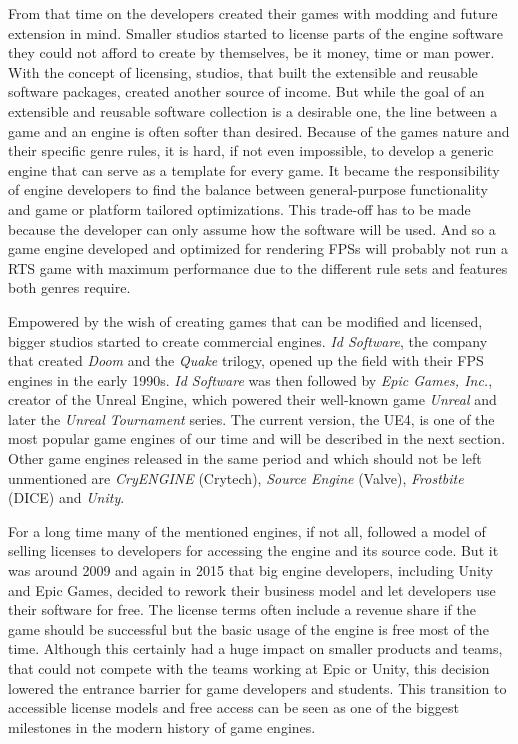 From that time on the developers created their games with modding and future extension in mind. Smaller studios started to license parts of the engine software they could not afford to create by themselves, be it money, time or man power. With the concept of licensing, studios, that built the extensible and reusable software packages, created another source of income. But while the goal of an extensible and reusable software collection is a desirable one, the line between a game and an engine is often softer than desired. Because of the games nature and their specific genre rules, it is hard, if not even impossible, to develop a generic engine that can serve as a template for every game. It became the responsibility of engine developers to find the balance between general-purpose functionality and game or platform tailored optimizations. This trade-off has to be made because the developer can only assume how the software will be used. And so a game engine developed and optimized for rendering \acp{FPS} will probably not run a \ac{RTS} game with maximum performance due to the different rule sets and features both genres require.

Empowered by the wish of creating games that can be modified and licensed, bigger studios started to create commercial engines. \textit{Id Software}, the company that created \textit{Doom} and the \textit{Quake} trilogy, opened up the field with their \ac{FPS} engines in the early 1990s. \textit{Id Software} was then followed by \textit{Epic Games, Inc.}, creator of the Unreal Engine, which powered their well-known game \textit{Unreal} and later the \textit{Unreal Tournament} series. The current version, the \ac{UE4}, is one of the most popular game engines of our time and will be described in the next section. Other game engines released in the same period and which should not be left unmentioned are \textit{CryENGINE} (Crytech), \textit{Source Engine} (Valve), \textit{Frostbite} (DICE) and \textit{Unity}.

For a long time many of the mentioned engines, if not all, followed a model of selling licenses to developers for accessing the engine and its source code. But it was around 2009 and again in 2015 that big engine developers, including Unity and Epic Games, decided to rework their business model and let developers use their software for free. The license terms often include a revenue share if the game should be successful but the basic usage of the engine is free most of the time. Although this certainly had a huge impact on smaller products and teams, that could not compete with the teams working at Epic or Unity, this decision lowered the entrance barrier for game developers and students. This transition to accessible license models and free access can be seen as one of the biggest milestones in the modern history of game engines.

